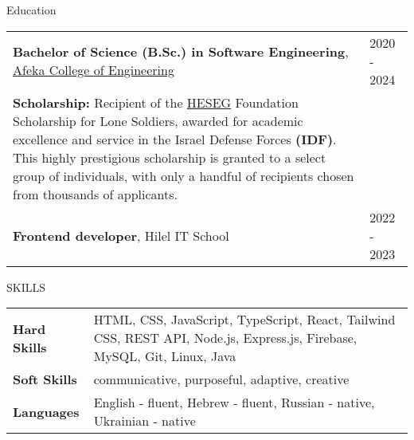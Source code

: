 \documentclass{resume}
\begin{document}

 \begin{rSection}{Education}
  \begin{tabular}{@{}p{}p{}}
  {\bf Bachelor of Science (B.Sc.) in Software Engineering}, \href{https://www.afeka.ac.il/}{Afeka College of Engineering} & \hfill 2020 - 2024\hspace*{1em} \\
  \textbf{Scholarship:} Recipient of the \href{https://www.heseg.com/}{HESEG} Foundation Scholarship for Lone Soldiers, awarded for academic excellence and service in the Israel Defense Forces \textbf{(IDF)}. This highly prestigious scholarship is granted to a select group of individuals, with only a handful of recipients chosen from thousands of applicants. & \hfill \\
  {\bf Frontend developer}, Hilel IT School & \hfill 2022 - 2023\hspace*{1em} \\
  \end{tabular}
 \end{rSection}












 \begin{rSection}{SKILLS}
  \begin{tabularx}{\textwidth}{@{}>{\bfseries}l X@{}}
   Hard Skills & HTML, CSS, JavaScript, TypeScript, React, Tailwind CSS, REST API, Node.js, Express.js, Firebase, MySQL, Git, Linux, Java \\
   Soft Skills & communicative, purposeful, adaptive, creative\\
   Languages & English - fluent, Hebrew - fluent, Russian - native, Ukrainian - native
  \end{tabularx}

 \end{rSection}

\end{document}
